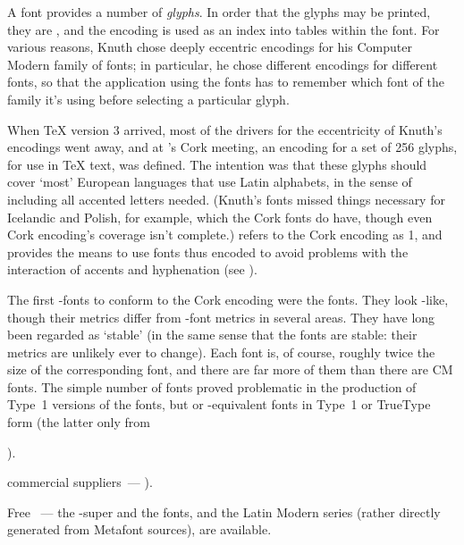 
A font provides a number of \emph{glyphs}. In order that the glyphs
may be printed, they are , and the
encoding is used as an index into tables within the font.  For various
reasons, Knuth chose deeply eccentric encodings for his Computer
Modern family of fonts; in particular, he chose different encodings
for different fonts, so that the application using the fonts has to
remember which font of the family it's using before selecting a
particular glyph.

When \TeX{} version 3 arrived, most of the drivers for the
eccentricity of Knuth's encodings went away, and at 's Cork
meeting, an encoding for a set of 256 glyphs, for use in \TeX{} text,
was defined.  The intention was that these glyphs should cover `most'
European languages that use Latin alphabets, in the sense of including
all accented letters needed.  (Knuth's  fonts missed things
necessary for Icelandic and Polish, for example, which the Cork fonts
do have, though even Cork encoding's coverage isn't complete.)
\latex{} refers to the Cork encoding as 1, and provides the
means to use fonts thus encoded to avoid problems with the interaction
of accents and hyphenation %
(see ).

The first \MF{}-fonts to conform to the Cork encoding were the 
fonts. They look -like, though their metrics differ from -font
metrics in several areas.  They have long been regarded as `stable' (in
the same sense that the  fonts are stable: their metrics are
unlikely ever to change).  Each  font is, of course, roughly twice the
size of the corresponding  font, and there are far more of them than
there are CM fonts.  The simple number of fonts proved problematic in
the production of Type~1 versions of the fonts, but  or
-equivalent fonts in Type~1 or TrueType form (the latter only from
\begin{wideversion}
  ).
\end{wideversion}
\begin{narrowversion}
  commercial suppliers~--- ).
\end{narrowversion}
Free ~--- the -super and
the  fonts, and the Latin Modern series (rather directly generated
from Metafont sources), are available.

